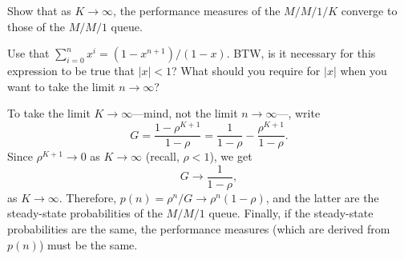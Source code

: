 \begin{extra}
 Show that as $K\to\infty$, the performance measures of the $M/M/1/K$ converge to those of the $M/M/1$ queue. 
\begin{hint}
Use that $\sum_{i=0}^n x^i = (1-x^{n+1})/(1-x)$. BTW, is it
 necessary for this expression to be true that $|x|<1$? What should
 you require for $|x|$ when you want to take the limit
 $n\to\infty$?
\end{hint}
\begin{solution}
To take the limit $K\to\infty$---mind, not the limit $n\to\infty$---, write
\begin{equation*}
G= \frac{1-\rho^{K+1}}{1-\rho} = \frac{1}{1-\rho} -\frac{\rho^{K+1}}{1-\rho}.
\end{equation*}
Since $\rho^{K+1}\to 0$ as $K\to \infty$ (recall, $\rho<1$), we get
\begin{equation*}
G \to \frac{1}{1-\rho}, 
\end{equation*}
as $K\to\infty$. Therefore, $p(n)=\rho^n/G \to \rho^n(1-\rho)$, and
the latter are the steady-state probabilities of the $M/M/1$
queue. Finally, if the steady-state probabilities are the same, the
performance measures (which are derived from $p(n)$) must be the same.
\end{solution}
\end{extra}

